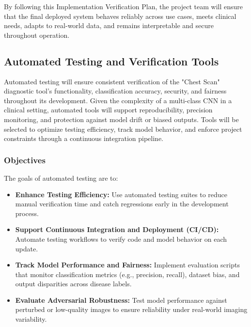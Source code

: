 \documentclass[12pt, titlepage]{article}
\begin{document}
By following this Implementation Verification Plan, the project team will ensure that the final deployed system behaves reliably across use cases, meets clinical needs, adapts to real-world data, and remains interpretable and secure throughout operation.

\subsection{Automated Testing and Verification Tools}


Automated testing will ensure consistent verification of the "Chest Scan" diagnostic tool's functionality, classification accuracy, security, and fairness throughout its development. Given the complexity of a multi-class CNN in a clinical setting, automated tools will support reproducibility, precision monitoring, and protection against model drift or biased outputs. Tools will be selected to optimize testing efficiency, track model behavior, and enforce project constraints through a continuous integration pipeline.

\subsubsection{Objectives}
The goals of automated testing are to:
\begin{itemize}
  \item \textbf{Enhance Testing Efficiency:} Use automated testing suites to reduce manual verification time and catch regressions early in the development process.
  \item \textbf{Support Continuous Integration and Deployment (CI/CD):} Automate testing workflows to verify code and model behavior on each update.
  \item \textbf{Track Model Performance and Fairness:} Implement evaluation scripts that monitor classification metrics (e.g., precision, recall), dataset bias, and output disparities across disease labels.
  \item \textbf{Evaluate Adversarial Robustness:} Test model performance against perturbed or low-quality images to ensure reliability under real-world imaging variability.
\end{itemize}
\end{document}
